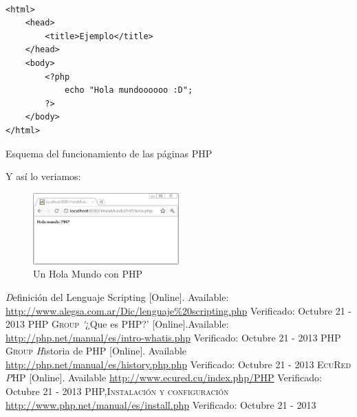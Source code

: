 \documentclass[11pt]{article} %
\begin{document}
\begin{lstlisting}[frame=single]  % Start your code-block

<html>
    <head>
        <title>Ejemplo</title>
    </head>
    <body>
        <?php
            echo "Hola mundoooooo :D";
        ?>
    </body>
</html>
\end{lstlisting}
\begin{center}
Esquema del funcionamiento de las páginas PHP \cite{[2]}
\end{center}
Y así lo veriamos:
\begin{figure}[H]
  \centering
    \includegraphics[width=0.5\textwidth]{Imagenes/HolaMundoPHP-Navegador}
  \caption{Un Hola Mundo con PHP}
  \label{fig:funcionamiento}
\end{figure}





\begin{thebibliography}{99}

\bibitem{[1]}  \textit Definición del Lenguaje Scripting [Online]. Available: \url{http://www.alegsa.com.ar/Dic/lenguaje%20scripting.php} Verificado: Octubre 21 - 2013
\bibitem{[2]}  \textsc{ PHP Group} \textit '¿Que es PHP?' [Online].Available: \url{http://php.net/manual/es/intro-whatis.php}  Verificado: Octubre 21 - 2013
\bibitem{[3]}  \textsc{ PHP Group} \textit Historia de PHP [Online]. Available \url{http://php.net/manual/es/history.php.php}  Verificado: Octubre 21 - 2013
\bibitem{[4]}  \textsc{ EcuRed} \textit PHP [Online]. Available \url{http://www.ecured.cu/index.php/PHP}  Verificado: Octubre 21 - 2013
\bibitem{[5]}  \textsc{PHP,Instalación y configuración} \url{http://www.php.net/manual/es/install.php}  Verificado: Octubre 21 - 2013

\end{thebibliography}
\end{document}

